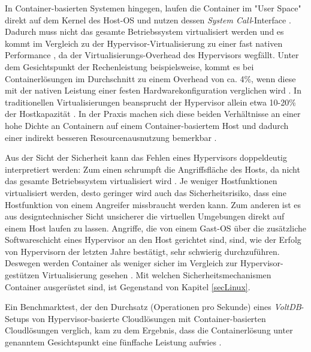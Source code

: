 \documentclass[../main.tex]{subfiles}
\begin{document}
      In Container-basierten Systemen hingegen, laufen die Container im "User Space" direkt auf dem Kernel des Host-OS und nutzen dessen \emph{System Call}-Interface \cite[S.6+7]{dockerBook}. Dadurch muss nicht das gesamte Betriebssystem virtualisiert werden und es kommt im Vergleich zu der Hypervisor-Virtualisierung zu einer fast nativen Performance \cite[S.1]{containerVirtPerformance}, da der Virtualisierungs-Overhead des Hypervisors wegfällt. Unter dem Gesichtspunkt der Rechenleistung beispielsweise, kommt es bei Containerlösungen im Durchschnitt zu einem Overhead von ca. 4\%, wenn diese mit der nativen Leistung einer festen Hardwarekonfiguration verglichen wird \cite[S.4]{containerVirtPerformance}\cite[S.5]{IBMcontVMcomparison}. In traditionellen Virtualisierungen beansprucht der Hypervisor allein etwa 10-20\% der Hostkapazität \cite[S.2]{dockerIntroIEEE}\cite[S.5]{IBMcontVMcomparison}. In der Praxis machen sich diese beiden Verhältnisse an einer hohe Dichte an Containern auf einem Container-basiertem Host und dadurch einer indirekt besseren Resourcenausnutzung bemerkbar \cite[S.7+8]{dockerBook}.

			Aus der Sicht der Sicherheit kann das Fehlen eines Hypervisors doppeldeutig interpretiert werden: Zum einen schrumpft die Angriffsfläche des Hosts, da nicht das gesamte Betriebssystem virtualisiert wird \cite[S.6]{dockerBook}. Je weniger Hostfunktionen virtualisiert werden, desto geringer wird auch das Sicherheitsrisiko, dass eine Hostfunktion von einem Angreifer missbraucht werden kann. Zum anderen ist es aus designtechnischer Sicht unsicherer die virtuellen Umgebungen direkt auf einem Host laufen zu lassen. Angriffe, die von einem Gast-OS über die zusätzliche Softwareschicht eines Hypervisor an den Host gerichtet sind, sind, wie der Erfolg von Hypervisorn der letzten Jahre bestätigt, sehr schwierig durchzuführen.
			Deswegen werden Container als weniger sicher im Vergleich zur Hypervisor-gestützen Virtualisierung gesehen \cite[S.6]{dockerBook}. Mit welchen Sicherheitsmechanismen Container ausgerüstet sind, ist Gegenstand von Kapitel \ref{secLinux}.


      Ein Benchmarktest, der den Durchsatz (Operationen pro Sekunde) eines \emph{VoltDB}-Setups\cite{voltdb} von Hypervisor-basierte Cloudlösungen mit Container-basierten Cloudlösungen verglich, kam zu dem Ergebnis, dass die Containerlösung unter genanntem Gesichtspunkt eine fünffache Leistung aufwies \cite[S.2+3]{voltdbBenchmark}.
\end{document}
